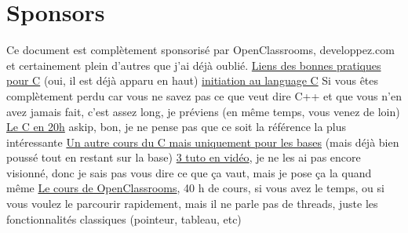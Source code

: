 \documentclass[a4paper]{article}
\begin{document}
\section{Sponsors}
Ce document est complètement sponsorisé par OpenClassrooms, developpez.com et certainement plein d'autres que j'ai déjà oublié.\newline
\href{http://emmanuel-delahaye.developpez.com/tutoriels/c/bonnes-pratiques-codage-c/#LI-A}{Liens des bonnes pratiques pour C} (oui, il est déjà apparu en haut)\newline
\href{http://melem.developpez.com/tutoriels/langage-c/initiation-langage-c/}{initiation au language C} Si vous êtes complètement perdu car vous ne savez pas ce que veut dire C++ et que vous n'en avez jamais fait, c'est assez long, je préviens (en même temps, vous venez de loin)\newline
\href{https://c.developpez.com/cours/20-heures/}{Le C en 20h} askip, bon, je ne pense pas que ce soit la référence la plus intéressante\newline
\href{https://c.developpez.com/cours/poly-c/?page=page_1}{Un autre cours du C mais uniquement pour les bases} (mais déjà bien poussé tout en restant sur la base)\newline
\href{https://fr.tuto.com/langage-c/}{3 tuto en vidéo}, je ne les ai pas encore visionné, donc je sais pas vous dire ce que ça vaut, mais je pose ça la quand même\newline
\href{https://openclassrooms.com/courses/apprenez-a-programmer-en-c}{Le cours de OpenClassrooms}, 40 h de cours, si vous avez le temps, ou si vous voulez le parcourir rapidement, mais il ne parle pas de threads, juste les fonctionnalités classiques (pointeur, tableau, etc)
\end{document}
